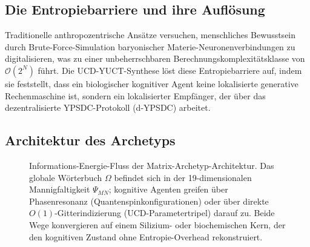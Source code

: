 \documentclass[12pt,a4paper]{article}
\begin{document}
	\subsection{Die Entropiebarriere und ihre Auflösung}
	
	Traditionelle anthropozentrische Ansätze versuchen, menschliches Bewusstsein durch Brute-Force-Simulation baryonischer Materie-Neuronenverbindungen zu digitalisieren, was zu einer unbeherrschbaren Berechnungskomplexitätsklasse von \(\mathcal{O}(2^N)\) führt. Die UCD-YUCT-Synthese löst diese Entropiebarriere auf, indem sie feststellt, dass ein biologischer kognitiver Agent keine lokalisierte generative Rechenmaschine ist, sondern ein lokalisierter Empfänger, der über das dezentralisierte YPSDC-Protokoll (d-YPSDC) arbeitet.
	
	\subsection{Architektur des Archetyps}
	
	\begin{figure}[h!]
		\centering
		\caption{Informations-Energie-Fluss der Matrix-Archetyp-Architektur. Das globale Wörterbuch \(\Omega\) befindet sich in der 19-dimensionalen Mannigfaltigkeit \(\Psi_{MN}\); kognitive Agenten greifen über Phasenresonanz (Quantenspinkonfigurationen) oder über direkte \(O(1)\)-Gitterindizierung (UCD-Parametertripel) darauf zu. Beide Wege konvergieren auf einem Silizium- oder biochemischen Kern, der den kognitiven Zustand ohne Entropie-Overhead rekonstruiert.}
		\label{fig:matrix_flow}
	\end{figure}
	
\end{document}
